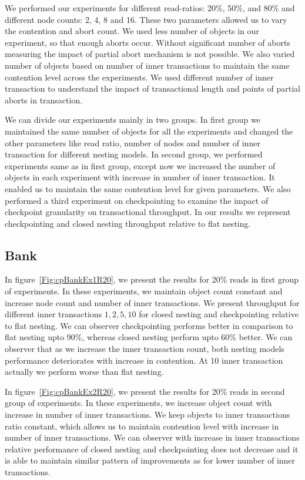 \documentclass[12pt,english]{report}
\begin{document}
We performed our experiments for different read-ratios: 20\%, 50\%, and 80\% and different node counts: 2, 4, 8 and 16. These two parameters allowed us to vary the contention and abort count. We used less number of objects in our experiment, so that enough aborts occur. Without significant number of aborts measuring the impact of partial abort mechanism is not possible. We also varied number of objects based on number of inner transactions to maintain the same contention level across the experiments. We used different number of inner transaction to understand the impact of transactional length and points of partial aborts in transaction.

We can divide our experiments mainly in two groups. In first group we maintained the same number of objects for all the experiments and changed the other parameters like read ratio, number of nodes and number of inner transaction for different nesting models. In second group, we performed experiments same as in first group, except now we increased the number of objects in each experiment with increase in number of inner transaction. It enabled us to maintain the same contention level for given parameters. We also performed a third experiment on checkpointing to examine the impact of checkpoint granularity on transactional throughput. In our results we represent checkpointing and closed nesting throughput relative to flat nesting.

\subsection{Bank}
In figure~\ref{Fig:cpBankEx1R20}, we present the results for 20\% reads in first group of experiments. In these experiments, we maintain object count constant and increase node count and number of inner transactions. We present throughput for different inner transactions ${1, 2, 5, 10}$ for closed nesting and checkpointing relative to flat nesting. We can observer checkpointing performs better in comparison to flat nesting upto 90\%, whereas closed nesting perform upto 60\% better. We can observer that as we increase the inner transaction count, both nesting models performance deteriorates with increase in contention. At 10 inner transaction actually we perform worse than flat nesting.

In figure~\ref{Fig:cpBankEx2R20}, we present the results for 20\% reads in second group of experiments. In these experiments, we increase object count with increase in number of inner transactions. We keep objects to inner transactions ratio constant, which allows us to maintain contention level with increase in number of inner transactions. We can observer with increase in inner transactions relative performance of closed nesting and checkpointing does not decrease and it is able to maintain similar pattern of improvements as for lower number of inner transactions.
\end{document}
